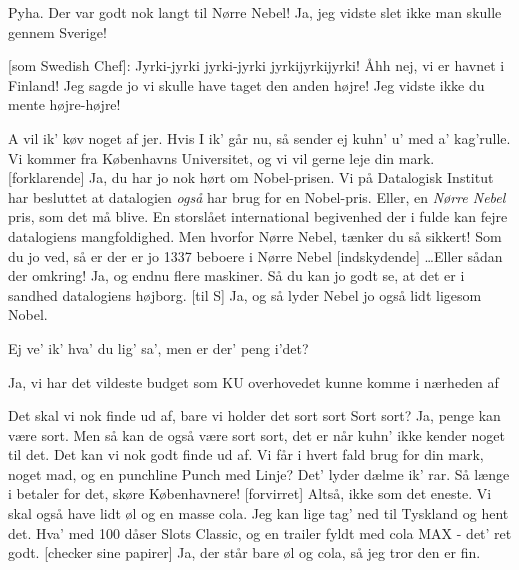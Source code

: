 \documentclass[a4paper,11pt]{article}
\begin{document}
\begin{sketch}

 Pyha. Der var godt nok langt til Nørre Nebel!
 Ja, jeg vidste slet ikke man skulle gennem Sverige!

[som Swedish Chef]: Jyrki-jyrki jyrki-jyrki jyrkijyrkijyrki!
 Åhh nej, vi er havnet i Finland!
 Jeg sagde jo vi skulle have taget den anden højre!
 Jeg vidste ikke du mente højre-højre!


 A vil ik' køv noget af jer. Hvis I ik' går nu, så sender ej kuhn' u' med a' kag'rulle.
 Vi kommer fra Københavns Universitet, og vi vil gerne leje din mark.
[forklarende] Ja, du har jo nok hørt om Nobel-prisen. Vi på Datalogisk Institut har besluttet at
    datalogien \emph{også} har brug for en Nobel-pris. Eller, en \emph{Nørre Nebel} pris, som det må blive.
 En storslået international begivenhed der i fulde kan fejre datalogiens mangfoldighed.
 Men hvorfor Nørre Nebel, tænker du så sikkert!
 Som du jo ved, så er der er jo 1337 beboere i Nørre Nebel
[indskydende] {\ldots}Eller sådan der omkring!
 Ja, og endnu flere maskiner.
 Så du kan jo godt se, at det er i sandhed datalogiens højborg.
[til S] Ja, og så lyder Nebel jo også lidt ligesom Nobel.

 Ej ve' ik' hva' du lig' sa', men er der' peng i'det?

 Ja, vi har det vildeste budget som KU overhovedet kunne komme i nærheden af

 Det skal vi nok finde ud af, bare vi holder det sort sort
 Sort sort?
 Ja, penge kan være sort. Men så kan de også være sort sort, det er når kuhn' ikke kender noget til det.
 Det kan vi nok godt finde ud af. Vi får i hvert fald brug for din mark, noget mad, og en punchline
 Punch med Linje? Det' lyder dælme ik' rar.
 Så længe i betaler for det, skøre Københavnere!
[forvirret] Altså, ikke som det eneste. Vi skal også have lidt øl og en masse cola.
 Jeg kan lige tag' ned til Tyskland og hent det. Hva' med 100 dåser
         Slots Classic, og en trailer fyldt med cola MAX - det' ret godt.
[checker sine papirer] Ja, der står bare øl og cola, så jeg tror den er fin.


\end{sketch}
\end{document}
